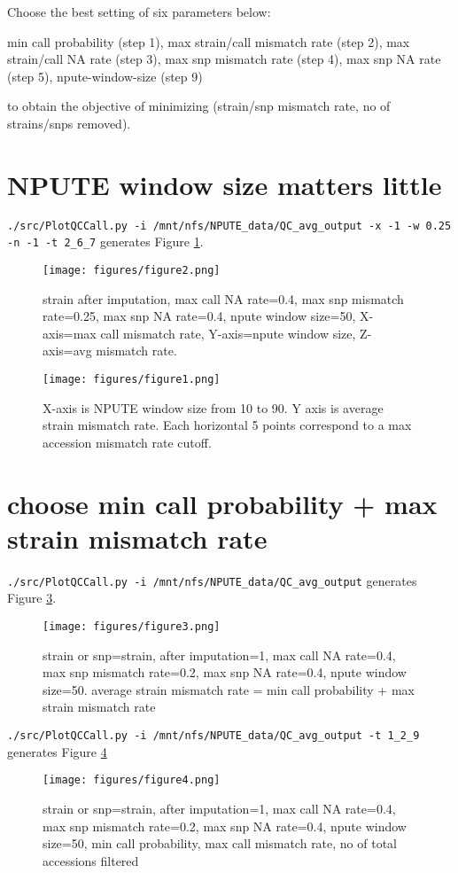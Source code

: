 \documentclass[a4paper,10pt]{article}
\begin{document}
Choose the best setting of six parameters below:

min call probability (step 1), max strain/call mismatch rate (step 2), max strain/call NA rate (step 3), max snp mismatch rate (step 4), max snp NA rate (step 5), npute-window-size (step 9)

to obtain the objective of minimizing (strain/snp mismatch rate, no of strains/snps removed).

\section{NPUTE window size matters little}

\verb+./src/PlotQCCall.py -i /mnt/nfs/NPUTE_data/QC_avg_output -x -1 -w 0.25 -n -1 -t 2_6_7+ generates Figure \ref{f2}.
\begin{figure}
\texttt{[image: figures/figure2.png]}
\caption{strain after imputation, max call NA rate=0.4, max snp mismatch rate=0.25, max snp NA rate=0.4, npute window size=50, X-axis=max call mismatch rate, Y-axis=npute window size, Z-axis=avg mismatch rate.}\label{f2}
\end{figure}

\begin{figure}
\texttt{[image: figures/figure1.png]}
\caption{X-axis is NPUTE window size from 10 to 90. Y axis is average strain mismatch rate. Each horizontal 5 points correspond to a max accession mismatch rate cutoff.}\label{f1}
\end{figure}



\section{choose min call probability + max strain mismatch rate}

\verb+./src/PlotQCCall.py -i /mnt/nfs/NPUTE_data/QC_avg_output+ generates Figure \ref{f3}.

\begin{figure}
\texttt{[image: figures/figure3.png]}
\caption{strain or snp=strain, after imputation=1, max call NA rate=0.4, max snp mismatch rate=0.2, max snp NA rate=0.4, npute window size=50. average strain mismatch rate = min call probability + max strain mismatch rate}\label{f3}
\end{figure}

\verb+./src/PlotQCCall.py -i /mnt/nfs/NPUTE_data/QC_avg_output -t 1_2_9+ generates Figure \ref{f4}
\begin{figure}
\texttt{[image: figures/figure4.png]}
\caption{strain or snp=strain, after imputation=1, max call NA rate=0.4, max snp mismatch rate=0.2, max snp NA rate=0.4, npute window size=50, min call probability, max call mismatch rate, no of total accessions filtered}\label{f4}
\end{figure}
\end{document}
